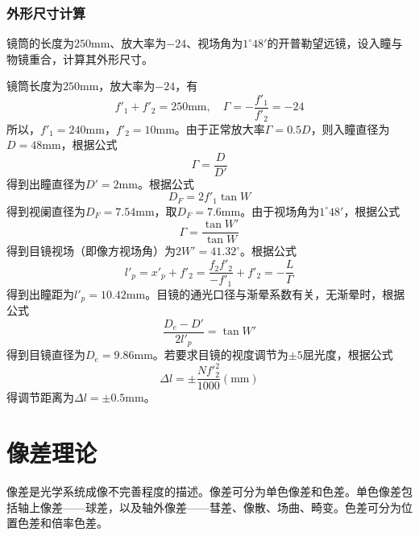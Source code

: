 \documentclass[cn,10pt,chinesefont=founder,math=newtx,cite=super,twoside]{elegantbook}
\begin{document}
\subsection{外形尺寸计算}
\begin{problem}
	\textbf{\color{red}{（重点）}}镜筒的长度为$250\mathrm{mm}$、放大率为$-24$、视场角为$1^{\circ}48'$的开普勒望远镜，设入瞳与物镜重合，计算其外形尺寸。
\end{problem}
\begin{solution}
	镜筒长度为$250\mathrm{mm}$，放大率为$-24$，有
	\begin{equation}
	f'_1+f'_2=250\mathrm{mm},\quad \varGamma=-\frac{f'_1}{f'_2}=-24 \nonumber
	\end{equation}
	所以，$f'_1=240\mathrm{mm}$，$f'_2=10\mathrm{mm}$。由于正常放大率$\varGamma=0.5D$，则入瞳直径为$D=48\mathrm{mm}$，根据公式
	\begin{equation}
	\varGamma=\frac{D}{D'} \nonumber
	\end{equation}
	得到出瞳直径为$D'=2\mathrm{mm}$。根据公式
	\begin{equation}
	D_F=2f'_1\tan W \nonumber
	\end{equation}
	得到视阑直径为$D_F=7.54\mathrm{mm}$，取$D_F=7.6\mathrm{mm}$。由于视场角为$1^{\circ}48'$，根据公式
	\begin{equation}
	\varGamma=\frac{\tan W'}{\tan W} \nonumber
	\end{equation}
	得到目镜视场（即像方视场角）为$2W'=41.32^{\circ}$。根据公式
	\begin{equation}
	l'_p=x'_p+f'_2=\frac{f_2f'_2}{-f'_1}+f'_2=-\frac{L}{\varGamma} \nonumber
	\end{equation}
	得到出瞳距为$l'_p=10.42\mathrm{mm}$。目镜的通光口径与渐晕系数有关，无渐晕时，根据公式
	\begin{equation}
	\frac{D_e-D'}{2l'_p}=\tan W' \nonumber
	\end{equation}
	得到目镜直径为$D_e=9.86\mathrm{mm}$。若要求目镜的视度调节为$\pm5$屈光度，根据公式
	\begin{equation}
	\Delta l=\pm\frac{Nf'^2_2}{1000}(\mathrm{mm}) \nonumber
	\end{equation}
	得调节距离为$\Delta l=\pm0.5\mathrm{mm}$。
\end{solution}

\chapter{像差理论}
像差是光学系统成像不完善程度的描述。像差可分为单色像差和色差。单色像差包括轴上像差——球差，以及轴外像差——彗差、像散、场曲、畸变。色差可分为位置色差和倍率色差。
\end{document}
